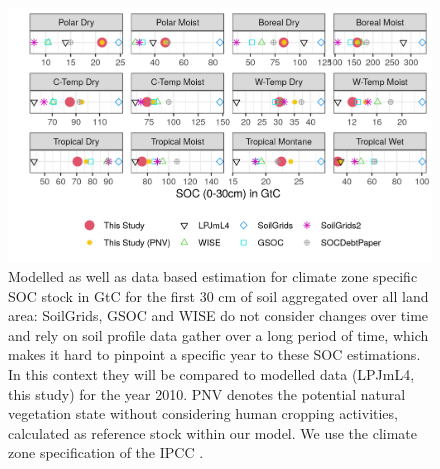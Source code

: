 \documentclass[gc, manuscript]{copernicus}
\begin{document}
\begin{figure}[H]
\includegraphics[width=16cm]{../ResultNotebooks/Output/Images/reg_comparisonfigure} 
\caption{Modelled as well as data based estimation for climate zone specific SOC stock in GtC for the first 30 cm of soil aggregated over all land area: SoilGrids, GSOC and WISE do not consider changes over time and rely on soil profile data gather over a long period of time, which makes it hard to pinpoint a specific year to these SOC estimations. In this context they will be compared to modelled data (LPJmL4, this study) for the year 2010. PNV denotes the potential natural vegetation state without considering human cropping activities, calculated as reference stock within our model. We use the climate zone specification of the IPCC \citep{eggleston_ipcc_2006}.}
\label{fig:SOCreg}
\end{figure}
\noappendix



\end{document}
